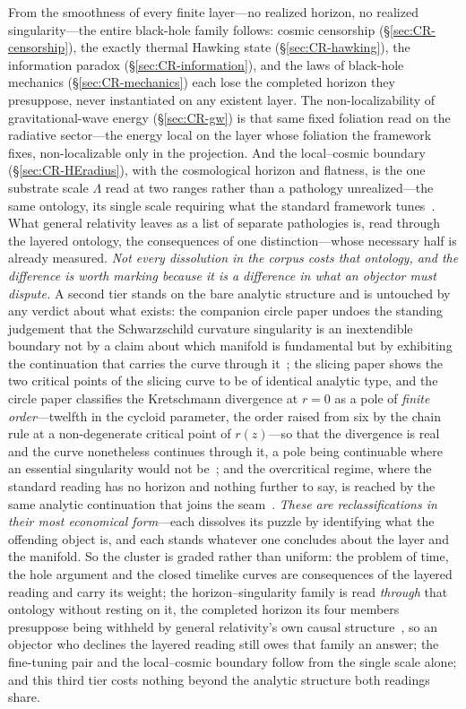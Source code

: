 \documentclass[11pt,a4paper]{article}
\theoremstyle{plain}
\theoremstyle{definition}
\theoremstyle{remark}
\begin{document}
From the smoothness of every finite layer---no realized horizon, no realized singularity---the entire black-hole family follows: cosmic censorship (\S\ref{sec:CR-censorship}), the exactly thermal Hawking state (\S\ref{sec:CR-hawking}), the information paradox (\S\ref{sec:CR-information}), and the laws of black-hole mechanics (\S\ref{sec:CR-mechanics}) each lose the completed horizon they presuppose, never instantiated on any existent layer. The non-localizability of gravitational-wave energy (\S\ref{sec:CR-gw}) is that same fixed foliation read on the radiative sector---the energy local on the layer whose foliation the framework fixes, non-localizable only in the projection. And the local--cosmic boundary (\S\ref{sec:CR-HEradius}), with the cosmological horizon and flatness, is the one substrate scale $\Lambda$ read at two ranges rather than a pathology unrealized---the same ontology, its single scale requiring what the standard framework tunes~\cite{JanzenGeometricCore,JanzenCRcosmology}. What general relativity leaves as a list of separate pathologies is, read through the layered ontology, the consequences of one distinction---whose necessary half is already measured. \emph{Not every dissolution in the corpus costs that ontology, and the difference is worth marking because it is a difference in what an objector must dispute.} A second tier stands on the bare analytic structure and is untouched by any verdict about what exists: the companion circle paper undoes the standing judgement that the Schwarzschild curvature singularity is an inextendible boundary not by a claim about which manifold is fundamental but by exhibiting the continuation that carries the curve through it~\cite{JanzenCircle}; the slicing paper shows the two critical points of the slicing curve to be of identical analytic type, and the circle paper classifies the Kretschmann divergence at $r=0$ as a pole of \emph{finite order}---twelfth in the cycloid parameter, the order raised from six by the chain rule at a non-degenerate critical point of $r(z)$---so that the divergence is real and the curve nonetheless continues through it, a pole being continuable where an essential singularity would not be~\cite{JanzenCircle}; and the overcritical regime, where the standard reading has no horizon and nothing further to say, is reached by the same analytic continuation that joins the seam~\cite{JanzenSlicing}. \emph{These are reclassifications in their most economical form}---each dissolves its puzzle by identifying what the offending object is, and each stands whatever one concludes about the layer and the manifold. So the cluster is graded rather than uniform: the problem of time, the hole argument and the closed timelike curves are consequences of the layered reading and carry its weight; the horizon--singularity family is read \emph{through} that ontology without resting on it, the completed horizon its four members presuppose being withheld by general relativity's own causal structure~\cite{JanzenBHcausality}, so an objector who declines the layered reading still owes that family an answer; the fine-tuning pair and the local--cosmic boundary follow from the single scale alone; and this third tier costs nothing beyond the analytic structure both readings share.
\end{document}
